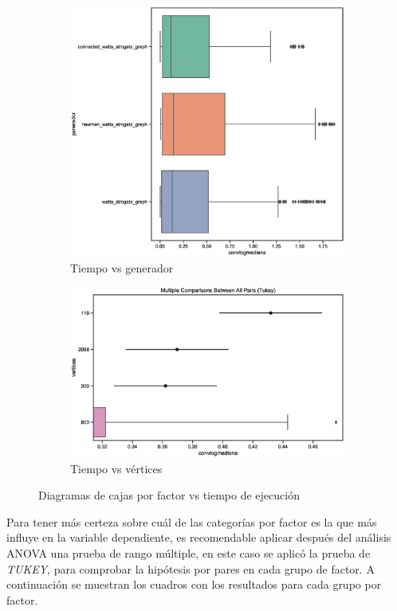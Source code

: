 \documentclass{article}
\begin{document}
\begin{figure}[htbp]
\begin{subfigure}{0.5\textwidth}
\includegraphics[width=0.9\linewidth]{Imagenes/aboxplotgenerador.eps}
\caption{Tiempo vs generador}
\end{subfigure}

\begin{subfigure}{0.5\textwidth}
\includegraphics[width=0.9\linewidth]{Imagenes/aboxplotvertices.eps}
\caption{Tiempo vs vértices}
\end{subfigure}
 
\caption{Diagramas de cajas por factor vs tiempo de ejecución}
\label{fig:Fig2}
\end{figure}

Para tener más certeza sobre cuál de las categorías por factor es la que más influye en la variable dependiente, es recomendable aplicar después del análisis ANOVA una prueba de rango múltiple, en este caso se aplicó la prueba de \textit{TUKEY}, para comprobar la hipótesis por pares en cada grupo de factor. A continuación se muestran los cuadros con los resultados para cada grupo por factor.
\end{document}
